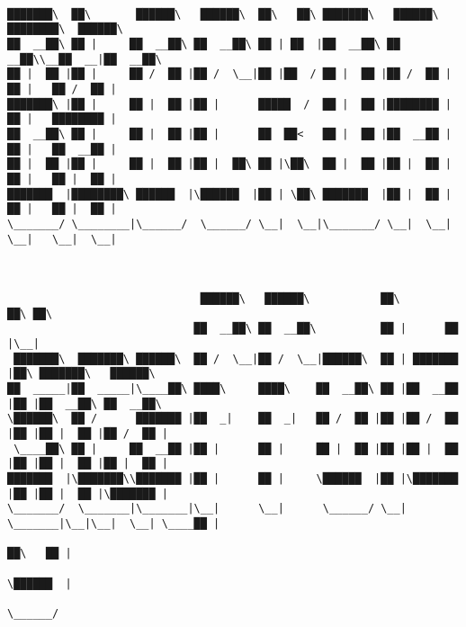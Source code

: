 \documentclass[varwidth=\maxdimen,margin=0.5cm,multi={verbatim}]{standalone}
\begin{document}
\begin{verbatim}

███████\  ██\       ██████\   ██████\  ██\   ██\ ███████\   ██████\ ████████\  ██████\
██  __██\ ██ |     ██  __██\ ██  __██\ ██ | ██  |██  __██\ ██  __██\\__██  __|██  __██\
██ |  ██ |██ |     ██ /  ██ |██ /  \__|██ |██  / ██ |  ██ |██ /  ██ |  ██ |   ██ /  ██ |
███████\ |██ |     ██ |  ██ |██ |      █████  /  ██ |  ██ |████████ |  ██ |   ████████ |
██  __██\ ██ |     ██ |  ██ |██ |      ██  ██<   ██ |  ██ |██  __██ |  ██ |   ██  __██ |
██ |  ██ |██ |     ██ |  ██ |██ |  ██\ ██ |\██\  ██ |  ██ |██ |  ██ |  ██ |   ██ |  ██ |
███████  |████████\ ██████  |\██████  |██ | \██\ ███████  |██ |  ██ |  ██ |   ██ |  ██ |
\_______/ \________|\______/  \______/ \__|  \__|\_______/ \__|  \__|  \__|   \__|  \__|



                              ██████\   ██████\           ██\       ██\ ██\
                             ██  __██\ ██  __██\          ██ |      ██ |\__|
 ███████\  ███████\ ██████\  ██ /  \__|██ /  \__|██████\  ██ | ███████ |██\ ███████\   ██████\
██  _____|██  _____|\____██\ ████\     ████\    ██  __██\ ██ |██  __██ |██ |██  __██\ ██  __██\
\██████\  ██ /      ███████ |██  _|    ██  _|   ██ /  ██ |██ |██ /  ██ |██ |██ |  ██ |██ /  ██ |
 \____██\ ██ |     ██  __██ |██ |      ██ |     ██ |  ██ |██ |██ |  ██ |██ |██ |  ██ |██ |  ██ |
███████  |\███████\\███████ |██ |      ██ |     \██████  |██ |\███████ |██ |██ |  ██ |\███████ |
\_______/  \_______|\_______|\__|      \__|      \______/ \__| \_______|\__|\__|  \__| \____██ |
                                                                                      ██\   ██ |
                                                                                      \██████  |
                                                                                       \______/



\end{verbatim}
\end{document}
